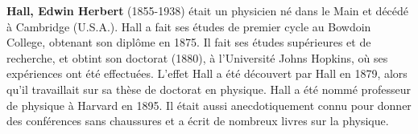 {}
\label{sec:H}

\textbf{Hall, Edwin Herbert} (1855-1938) était un physicien né dans le Main et décédé à Cambridge (U.S.A.). Hall a fait ses études de premier cycle au Bowdoin College, obtenant son diplôme en 1875. Il fait ses études supérieures et de recherche, et obtint son doctorat (1880), à l'Université Johns Hopkins, où ses expériences ont été effectuées. L'effet Hall a été découvert par Hall en 1879, alors qu'il travaillait sur sa thèse de doctorat en physique. Hall a été nommé professeur de physique à Harvard en 1895. Il était aussi anecdotiquement connu pour donner des conférences sans chaussures et a écrit de nombreux livres sur la physique.\\

